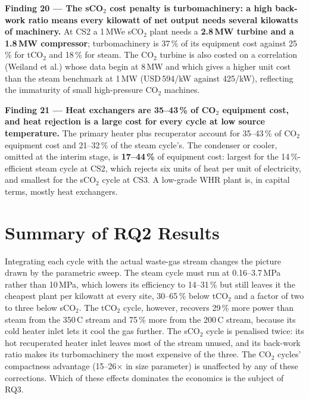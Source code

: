 \documentclass[12pt,a4paper]{report}
\newcommand{\keyresult}[1]{\textbf{\color{resultgreen}#1}}
\begin{document}
\begin{findingbox}
\textbf{Finding 20 --- The sCO$_2$ cost penalty is turbomachinery: a high
back-work ratio means every kilowatt of net output needs several kilowatts
of machinery.}
At CS2 a 1\,MWe sCO$_2$ plant needs a \keyresult{2.8\,MW turbine and a
1.8\,MW compressor}; turbomachinery is 37\,\% of its equipment cost against
25\,\% for tCO$_2$ and 18\,\% for steam. The CO$_2$ turbine is also costed on
a correlation (Weiland et al.) whose data begin at 8\,MW and which gives a
higher unit cost than the steam benchmark at 1\,MW (USD\,594/kW against
425/kW), reflecting the immaturity of small high-pressure CO$_2$ machines.
\end{findingbox}

\begin{findingbox}
\textbf{Finding 21 --- Heat exchangers are 35--43\,\% of CO$_2$ equipment cost,
and heat rejection is a large cost for every cycle at low source
temperature.}
The primary heater plus recuperator account for 35--43\,\% of CO$_2$
equipment cost and 21--32\,\% of the steam cycle's. The condenser or cooler,
omitted at the interim stage, is \keyresult{17--44\,\%} of equipment cost:
largest for the 14\,\%-efficient steam cycle at CS2, which rejects six units
of heat per unit of electricity, and smallest for the sCO$_2$ cycle at CS3.
A low-grade WHR plant is, in capital terms, mostly heat exchangers.
\end{findingbox}

\section{Summary of RQ2 Results}
\label{sec:rq2_summary}

Integrating each cycle with the actual waste-gas stream changes the picture
drawn by the parametric sweep. The steam cycle must run at 0.16--3.7\,MPa
rather than 10\,MPa, which lowers its efficiency to 14--31\,\% but still
leaves it the cheapest plant per kilowatt at every site, 30--65\,\% below
tCO$_2$ and a factor of two to three below sCO$_2$. The tCO$_2$ cycle,
however, recovers 29\,\% more power than steam from the 350\,\textdegree C
stream and 75\,\% more from the 200\,\textdegree C stream, because its cold
heater inlet lets it cool the gas further. The sCO$_2$ cycle is penalised
twice: its hot recuperated heater inlet leaves most of the stream unused,
and its back-work ratio makes its turbomachinery the most expensive of the
three. The CO$_2$ cycles' compactness advantage (15--26$\times$ in size
parameter) is unaffected by any of these corrections. Which of these effects
dominates the economics is the subject of RQ3.
\end{document}
